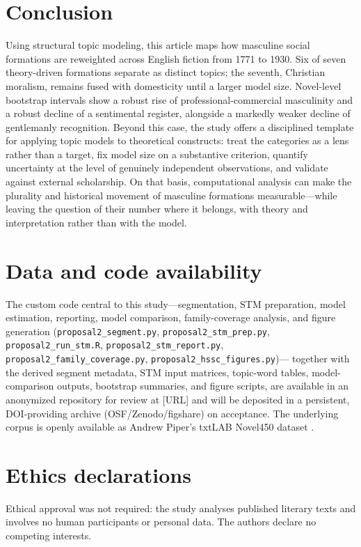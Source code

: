 \documentclass[11pt]{article}
\begin{document}
\section{Conclusion}

Using structural topic modeling, this article maps how masculine social
formations are reweighted across English fiction from 1771 to 1930. Six of seven
theory-driven formations separate as distinct topics; the seventh, Christian
moralism, remains fused with domesticity until a larger model size. Novel-level
bootstrap intervals show a robust rise of professional-commercial masculinity and
a robust decline of a sentimental register, alongside a markedly weaker decline of
gentlemanly recognition. Beyond this case, the study offers a disciplined
template for applying topic models to theoretical constructs: treat the
categories as a lens rather than a target, fix model size on a substantive
criterion, quantify uncertainty at the level of genuinely independent
observations, and validate against external scholarship. On that basis, computational analysis can make the
plurality and historical movement of masculine formations measurable---while
leaving the question of their number where it belongs, with theory and
interpretation rather than with the model.

\section*{Data and code availability}
The custom code central to this study---segmentation, STM preparation, model
estimation, reporting, model comparison, family-coverage analysis, and
figure generation (\texttt{proposal2\_segment.py}, \texttt{proposal2\_stm\_prep.py},
\texttt{proposal2\_run\_stm.R}, \texttt{proposal2\_stm\_report.py},
\texttt{proposal2\_family\_coverage.py}, \texttt{proposal2\_hssc\_figures.py})---
together with the derived segment metadata, STM input matrices, topic-word
tables, model-comparison outputs, bootstrap summaries, and figure scripts, are
available in an anonymized repository for review at [URL] and will be deposited
in a persistent, DOI-providing archive (OSF/Zenodo/figshare) on acceptance. The
underlying corpus is openly available as Andrew Piper's txtLAB Novel450 dataset
\citep{piper2016txtlab}.

\section*{Ethics declarations}
Ethical approval was not required: the study analyses published literary texts
and involves no human participants or personal data. The authors declare no
competing interests.
\end{document}
